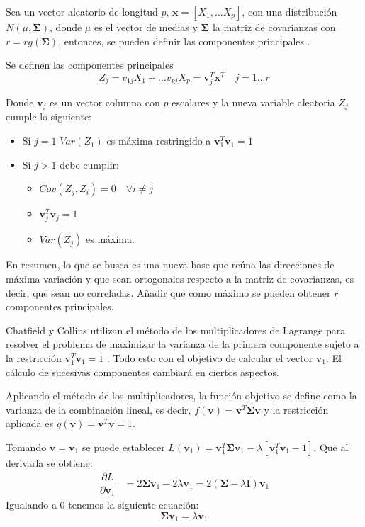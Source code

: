 \noindent Sea un vector aleatorio de longitud $p$, $\mathbf{x}=[X_1,\ldots X_p]$, con una distribución $N(\mu, \mathbf{\Sigma})$, donde $\mu$ es el vector de medias y $\mathbf{\Sigma}$ la matriz de covarianzas con $r=rg(\mathbf{\Sigma})$, entonces,  se pueden definir las componentes principales \cite{Cuadras 2014}.
\begin{defi}
Se definen las componentes principales 
\begin{equation}
Z_j=v_{1j}X_1+\ldots v_{pj}X_p=\mathbf{v}_j^T\mathbf{x}^T \quad j=1\ldots r
\end{equation}

\noindent Donde $\textbf{v}_j$ es un vector columna con $p$ escalares y la nueva variable aleatoria $Z_j$ cumple lo siguiente:
\begin{itemize}
\item Si $j=1$ $Var(Z_1)$ es máxima restringido a $\mathbf{v}_1^T \mathbf{v}_1=1$
\item Si $j>1$ debe cumplir:
\begin{itemize}
\item $Cov(Z_j,Z_i)=0\quad \forall i\neq j $
\item $\textbf{v}_j^T \textbf{v}_j=1$
\item $Var(Z_j)$ es máxima. 
\end{itemize}
\end{itemize}
\noindent En resumen, lo que se busca es una nueva base que reúna las direcciones de máxima variación y que sean ortogonales respecto a la matriz de covarianzas, es decir, que sean no correladas. Añadir que como máximo se pueden obtener $r$ componentes principales. 
\end{defi}
\noindent Chatfield y Collins  utilizan el método de los multiplicadores de Lagrange para resolver el problema de maximizar  la varianza de la primera componente sujeto a la restricción $\textbf{v}_1^T\textbf{v}_1=1$ \cite{Chatfield 1989}. Todo esto con el objetivo de calcular el vector $\mathbf{v}_1$. El cálculo de sucesivas componentes cambiará en ciertos aspectos. 

\noindent Aplicando el método de los multiplicadores, la función objetivo se define como la varianza de la combinación lineal, es decir, $f(\mathbf{v})=\mathbf{v}^T \mathbf{\Sigma} \mathbf{v}$ y la restricción aplicada es $g(\textbf{v})=\textbf{v}^T\textbf{v}=1$. 

\noindent Tomando $\mathbf{v}=\textbf{v}_1$ se puede establecer $L(\textbf{v}_1)=\textbf{v}_1^T \mathbf{\Sigma} \textbf{v}_1 - \lambda[\textbf{v}_1^T \textbf{v}_1-1]$. Que al derivarla se obtiene:
\begin{align*}
\dfrac{\partial L}{\partial \textbf{v}_1} &= 2\mathbf{\Sigma} \textbf{v}_1 - 2\lambda\textbf{v}_1= 2(\mathbf{\Sigma}-\lambda\mathbf{I})\textbf{v}_1 
\end{align*}
\noindent Igualando a 0 tenemos la siguiente ecuación: 
\begin{equation}
\mathbf{\Sigma}\textbf{v}_1=\lambda \textbf{v}_1
\end{equation}

